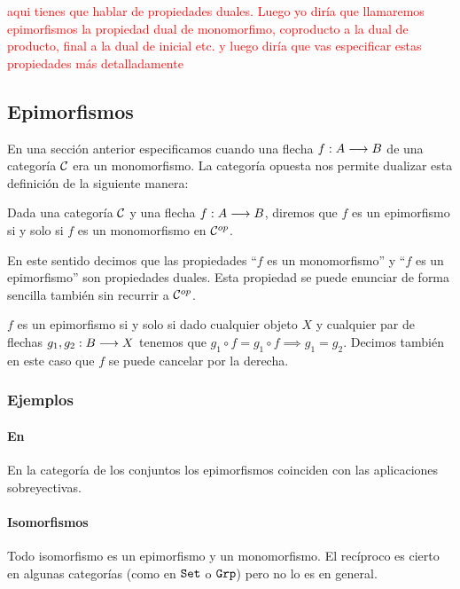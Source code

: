 \textcolor{red}{aqui tienes que hablar de propiedades duales. Luego yo diría que llamaremos epimorfismos la propiedad dual de monomorfimo, coproducto a la dual de producto, final a la dual de inicial etc.  y luego diría que vas especificar estas propiedades más detalladamente }



\subsection{Epimorfismos}
En una sección anterior especificamos cuando una flecha
$f : A\longrightarrow B$ de una categoría $\mathcal{C}$ era un monomorfismo. La categoría
opuesta nos permite dualizar esta definición de la siguiente manera:

\begin{definition}
Dada una categoría $\mathcal{C}$ y una flecha $f: A\longrightarrow B$, diremos que
$f$ es un epimorfismo si y solo si $f$ es un monomorfismo en
$\mathcal{C}^{op}$.
\end{definition}

En este sentido decimos que las propiedades ``$f$ es un monomorfismo''
y ``$f$ es un epimorfismo'' son propiedades duales. Esta propiedad
se puede enunciar de forma sencilla también sin recurrir a
$\mathcal{C}^{op}$.

\begin{proposition}
$f$ es un epimorfismo si y solo si dado cualquier objeto $X$ y
cualquier par de flechas $g_1, g_2 : B\longrightarrow X$
tenemos que $g_1 \circ f = g_1 \circ f \implies g_1 = g_2$.
Decimos también en este caso que $f$ se puede cancelar por la
derecha.
\end{proposition}

\subsubsection{Ejemplos}
\paragraph{En \Set}
En la categoría de los conjuntos los epimorfismos coinciden con las
aplicaciones sobreyectivas.

\paragraph{Isomorfismos}
Todo isomorfismo es un epimorfismo y un monomorfismo. El recíproco
es cierto en algunas categorías (como en $\texttt{Set}$ o $\texttt{Grp}$) pero no
lo es en general.

